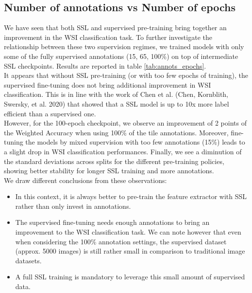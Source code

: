 \subsection{Number of annotations vs Number of epochs}

We have seen that both SSL and supervised pre-training bring together an improvement in the WSI classification task. To further investigate the relationship between these two supervision regimes, we trained models with only some of the fully supervised annotations (15, 65, 100\%) on top of intermediate SSL checkpoints.
Results are reported in table \ref{tab:annots_epochs}. \\
It appears that without SSL pre-training (or with too few epochs of training), the supervised fine-tuning does not bring additional improvement in WSI classification. This is in line with the work of Chen et al. (Chen, Kornblith, Swersky, et al. 2020) that showed that a SSL model is up to 10x more label efficient than a supervised one. \\
However, for the 100-epoch checkpoint, we observe an improvement of 2 points of the Weighted Accuracy when using 100\% of the tile annotations.
Moreover, fine-tuning the models by mixed supervision with too few annotations (15\%) leads to a slight drop in WSI classification performances.
Finally, we see  a diminution of the standard deviations across splits for the different pre-training policies, showing better stability for longer SSL training and more annotations. \\

We draw different conclusions from these observations:
\begin{itemize}
\item In this context, it is always better to pre-train the feature extractor with SSL rather than only invest in annotations.
\item The supervised fine-tuning needs enough annotations to bring an improvement to the WSI classification task. We can note however that even when considering the 100\% annotation settings, the supervised dataset (approx. 5000 images) is still rather small in comparison to traditional image datasets.
\item A full SSL training is mandatory to leverage this small amount of supervised data. 
\end{itemize}

